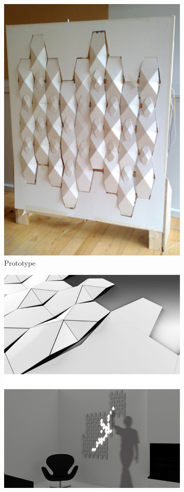 \begin{figure}
	\centering
	\begin{subfigure}{.46\textwidth}
		\centering
		\includegraphics[width=.9\linewidth]{figures/beomotion/prototype}
		\caption{Prototype}
	\end{subfigure}%
	\begin{subfigure}{.54\textwidth}
		\centering
		\includegraphics[width=.9\linewidth]{figures/beomotion/concepts}

\end{subfigure}
\end{figure}
